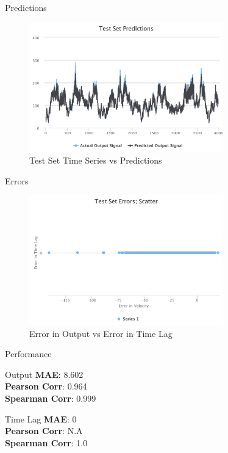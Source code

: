 \documentclass{beamer}
\begin{document}
\begin{frame}{Predictions}
    \begin{figure}[h]
        \includegraphics[width=0.75\textwidth]{predictions-i.png}
        \caption{Test Set Time Series vs Predictions}
        \label{fig:predictions-i}
      \end{figure}
\end{frame}

\begin{frame}{Errors}
    \begin{figure}[h]
        \includegraphics[width=0.75\textwidth]{errors-i.png}
        \caption{Error in Output vs Error in Time Lag}
        \label{fig:errors-i}
      \end{figure}
\end{frame}

\begin{frame}{Performance}
 
\begin{block}{Output}
\textbf{MAE}: 8.602 \\
\textbf{Pearson Corr}: 0.964 \\
\textbf{Spearman Corr}: 0.999
\end{block}

\begin{block}{Time Lag}
\textbf{MAE}: 0 \\
\textbf{Pearson Corr}: N.A \\
\textbf{Spearman Corr}: 1.0
\end{block}



\end{frame}
\end{document}
